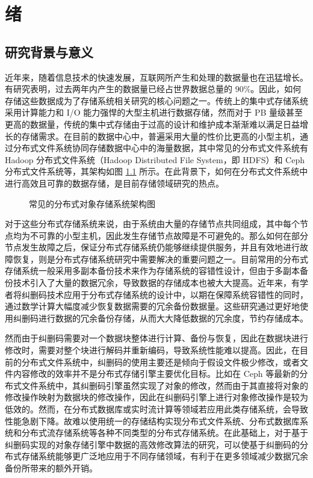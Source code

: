 \chapter[绪论]{绪}
\section{研究背景与意义}
近年来，随着信息技术的快速发展，互联网所产生和处理的数据量也在迅猛增长。有研究表明，过去两年内产生的数据量已经占世界数据总量的 $90\%$\cite{bradshaw2013big}。因此，如何存储这些数据成为了存储系统相关研究的核心问题之一。传统上的集中式存储系统采用计算能力和 I/O 能力强悍的大型主机进行数据存储，然而对于 PB 量级甚至更高的数据量\cite{li2013erasure}，传统的集中式存储由于过高的设计和维护成本渐渐难以满足日益增长的存储需求。在目前的数据中心中，普遍采用大量的性价比更高的小型主机，通过分布式文件系统协同存储数据中心中的海量数据，其中常见的分布式文件系统有 Hadoop 分布式文件系统（Hadoop Distributed File System，即 HDFS）\cite{shvachko2010hadoop}和 Ceph 分布式文件系统\cite{weil2006ceph}等，其架构如图 \ref{p9} 所示。在此背景下，如何在分布式文件系统中进行高效且可靠的数据存储，是目前存储领域研究的热点。

\begin{figure}[!htb]
\centering
\resizebox{.8\textwidth}{!}{}
\caption{常见的分布式对象存储系统架构图}
\label{p9}
\end{figure}

对于这些分布式存储系统来说，由于系统由大量的存储节点共同组成，其中每个节点均为不可靠的小型主机，因此发生存储节点故障是不可避免的。那么如何在部分节点发生故障之后，保证分布式存储系统仍能够继续提供服务，并且有效地进行故障恢复，则是分布式存储系统研究中需要解决的重要问题之一。目前常用的分布式存储系统一般采用多副本备份技术来作为存储系统的容错性设计，但由于多副本备份技术引入了大量的数据冗余，导致数据的存储成本也被大大提高。近年来，有学者将纠删码技术应用于分布式存储系统的设计中\cite{chen2017ahdfs,xie2019az,wei2018new,haddock2017gpu,drucker2018comeback,li2019openec}，以期在保障系统容错性的同时，通过数学计算大幅度减少恢复数据需要的冗余备份数据量。这些研究通过更好地使用纠删码进行数据的冗余备份存储，从而大大降低数据的冗余度，节约存储成本。

然而由于纠删码需要对一个数据块整体进行计算、备份与恢复，因此在数据块进行修改时，需要对整个块进行解码并重新编码，导致系统性能难以提高。因此，在目前的分布式文件系统中，纠删码的使用主要还是倾向于假设文件极少修改，或者文件内容修改的效率并不是分布式存储引擎主要优化目标。比如在 Ceph 等最新的分布式文件系统中，其纠删码引擎虽然实现了对象的修改，然而由于其直接将对象的修改操作映射为数据块的修改操作，因此在纠删码引擎上进行对象修改操作是较为低效的。然而，在分布式数据库或实时流计算等领域若应用此类存储系统，会导致性能急剧下降。故难以使用统一的存储结构实现分布式文件系统、分布式数据库系统和分布式流存储系统等各种不同类型的分布式存储系统。在此基础上，对于基于纠删码实现的对象存储引擎中数据的高效修改算法的研究，可以使基于纠删码的分布式存储系统能够更广泛地应用于不同存储领域，有利于在更多领域减少数据冗余备份所带来的额外开销。
